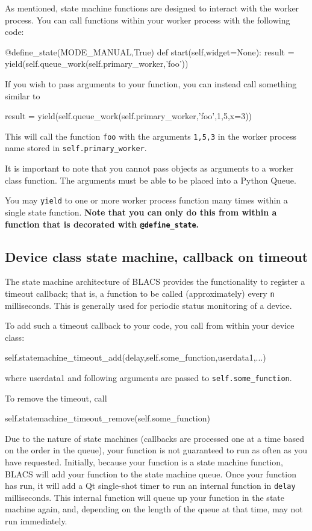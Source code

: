 \documentclass[12pt]{article}
\begin{document}
As mentioned, state machine functions are designed to interact with the worker process. You can call functions within your worker process with the following code:
\begin{python}
    @define_state(MODE_MANUAL,True)
    def start(self,widget=None):
        result = yield(self.queue_work(self.primary_worker,'foo'))
\end{python}

If you wish to pass arguments to your function, you can instead call something similar to
\begin{python}
        result = yield(self.queue_work(self.primary_worker,'foo',1,5,x=3))
\end{python}
This will call the function \texttt{foo} with the arguments \texttt{1,5,3} in the worker process name stored in \texttt{self.primary\_worker}.

It is important to note that you cannot pass objects as arguments to a worker class function. The arguments must be able to be placed into a Python Queue.

You may \texttt{yield} to one or more worker process function many times within a single state function.
\textbf{Note that you can only do this from within a function that is decorated with \texttt{@define\_state}.}



\subsection{Device class state machine, callback on timeout}\label{statemachine_timeout_add}
The state machine architecture of BLACS provides the functionality to register a timeout callback; that is, a function to be called (approximately) every \texttt{n} milliseconds. 
This is generally used for periodic status monitoring of a device.

To add such a timeout callback to your code, you call from within your device class:
\begin{python}
self.statemachine_timeout_add(delay,self.some_function,userdata1,...)
\end{python}
where userdata1 and following arguments are passed to \texttt{self.some\_function}.

To remove the timeout, call 
\begin{python}
self.statemachine_timeout_remove(self.some_function)
\end{python}

Due to the nature of state machines (callbacks are processed one at a time based on the order in the queue), your function is not guaranteed to run as often as you have requested. Initially, because your function is a state machine function, BLACS will add your function to the state machine queue. Once your function has run, it will add a Qt single-shot timer to run an internal function in \texttt{delay} milliseconds. This internal function will queue up your function in the state machine again, and, depending on the length of the queue at that time, may not run immediately. 
\end{document}

